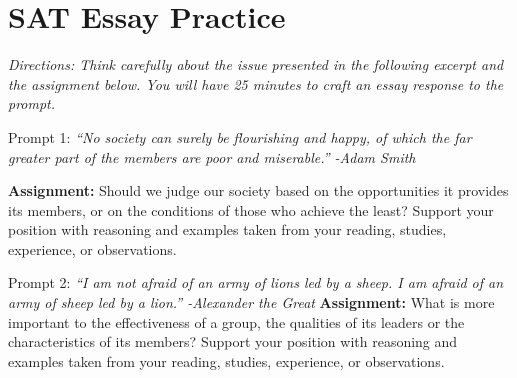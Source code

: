 \section{SAT Essay Practice}
\textit{Directions: Think carefully about the issue presented in the following excerpt and the assignment
below. You will have 25 minutes to craft an essay response to the prompt.}


\large{Prompt 1:} \textit{``No society can surely be flourishing and happy, of which the far greater part of the members are poor and miserable.'' -Adam Smith}

\large{\bf{Assignment:}} Should we judge our society based on the opportunities it provides its members, or on the conditions of those who achieve the least? Support your position with reasoning and examples taken from your reading, studies, experience, or observations.

\newpage


\large{Prompt 2:}  \textit{``I am not afraid of an army of lions led by a sheep. I am afraid of an army of sheep led by a lion.'' -Alexander the Great}
\large{\bf{Assignment:}} What is more important to the effectiveness of a group, the qualities of its leaders or the characteristics of its members? Support your position with reasoning and examples taken from your reading, studies, experience, or observations.

